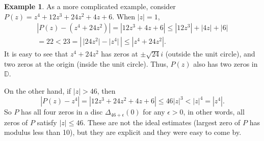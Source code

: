 \documentclass[12pt,openany]{book}
\newcommand{\sabs}[1]{\lvert {#1} \rvert}
\newcommand{\abs}[1]{\left\lvert {#1} \right\rvert}
\newcommand{\D}{{\mathbb{D}}}
\theoremstyle{plain}
\theoremstyle{remark}
\theoremstyle{definition}
\theoremstyle{exercise}
\theoremstyle{example}
\newtheorem{example}[thm]{Example}
\begin{document}
\begin{example}
As a more complicated example, consider $P(z) = z^4+12z^3+24z^2+4z+6$.
When $\sabs{z}=1$,
\begin{multline*}
\abs{P(z)-(z^4+24z^2)} =
\abs{12z^3+4z+6} \leq
\abs{12z^3}+\abs{4z}+\abs{6} \\
= 22 < 23 = \abs{\,\sabs{24 z^2} - \sabs{z^4}\,}
\leq \abs{z^4+24z^2} .
\end{multline*}
It is easy to see that $z^4+24z^2$ has zeros at $\pm \sqrt{24} i$ (outside
the unit circle), and two zeros at the origin (inside the unit circle).
Thus, $P(z)$ also has two zeros in $\D$.

On the other hand, if $\sabs{z} > 46$, then
\begin{equation*}
\abs{P(z)-z^4} = \abs{12z^3+24z^2+4z+6}
\leq 46 \sabs{z}^3 < {\sabs{z}}^4 = \abs{z^4}.
\end{equation*}
So $P$ has all four zeros in a disc $\Delta_{46+\epsilon}(0)$ for any
$\epsilon > 0$,
in other words, all zeros of $P$ satisfy $\sabs{z} \leq 46$.
These are not the ideal estimates (largest zero of $P$ has modulus less than
10), but they are explicit and they were easy to come by.
\end{example}
\end{document}
